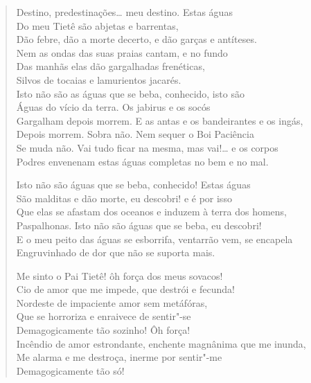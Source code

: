 {\begin{verse}
Destino, predestinações\ldots{} meu destino. Estas águas\\
Do meu Tietê são abjetas e barrentas,\\
Dão febre, dão a morte decerto, e dão garças e antíteses.\\
Nem as ondas das suas praias cantam, e no fundo\\
Das manhãs elas dão gargalhadas frenéticas,\\
Silvos de tocaias e lamurientos jacarés.\\
Isto não são as águas que se beba, conhecido, isto são\\
Águas do vício da terra. Os jabirus e os socós\\
Gargalham depois morrem. E as antas e os bandeirantes e os ingás,\\
Depois morrem. Sobra não. Nem sequer o Boi Paciência\\
Se muda não. Vai tudo ficar na mesma, mas vai!\ldots{} e os corpos\\
Podres envenenam estas águas completas no bem e no mal.

Isto não são águas que se beba, conhecido! Estas águas\\
São malditas e dão morte, eu descobri! e é por isso\\
Que elas se afastam dos oceanos e induzem à terra dos homens,\\
Paspalhonas. Isto não são águas que se beba, eu descobri!\\
E o meu peito das águas se esborrifa, ventarrão vem, se encapela\\
Engruvinhado de dor que não se suporta mais.

Me sinto o Pai Tietê! ôh força dos meus sovacos!\\
Cio de amor que me impede, que destrói e fecunda!\\
Nordeste de impaciente amor sem metáfóras,\\
Que se horroriza e enraivece de sentir"-se\\
Demagogicamente tão sozinho! Ôh força!\\
Incêndio de amor estrondante, enchente magnânima que me inunda,\\
Me alarma e me destroça, inerme por sentir"-me\\
Demagogicamente tão só!


\end{verse}}
